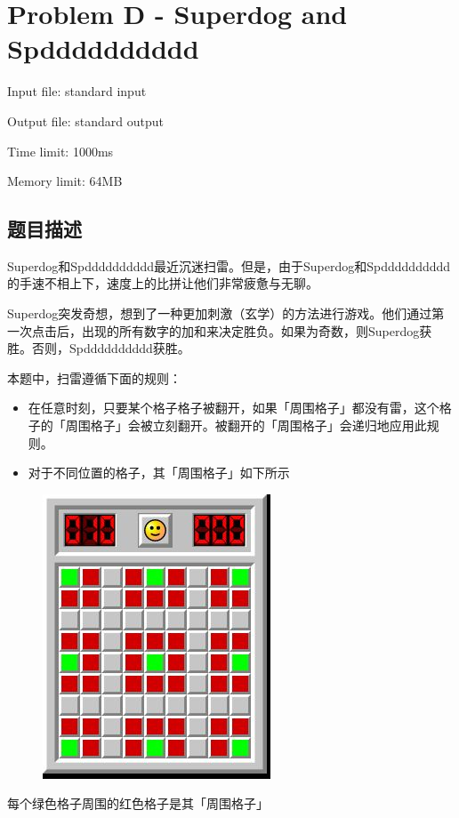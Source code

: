 \newpage
\section{Problem D - Superdog and Spdddddddddd}
{ \limitfont{}
Input file: standard input \par
Output file: standard output \par
Time limit: 1000ms \par
Memory limit: 64MB \par
}
\subsection*{题目描述}
Superdog和Spdddddddddd最近沉迷扫雷。但是，由于Superdog和Spdddddddddd的手速不相上下，速度上的比拼让他们非常疲惫与无聊。

Superdog突发奇想，想到了一种更加刺激（玄学）的方法进行游戏。他们通过第一次点击后，出现的所有数字的加和来决定胜负。如果为奇数，则Superdog获胜。否则，Spdddddddddd获胜。

本题中，扫雷遵循下面的规则：
\begin{itemize}
    \item 在任意时刻，只要某个格子格子被翻开，如果「周围格子」都没有雷，这个格子的「周围格子」会被立刻翻开。被翻开的「周围格子」会递归地应用此规则。
    \item 对于不同位置的格子，其「周围格子」如下所示
\end{itemize}

\begin{figure}[H]
    \centering
    \includegraphics[scale=0.5]{./src/d1.png}
\end{figure}
每个绿色格子周围的红色格子是其「周围格子」

